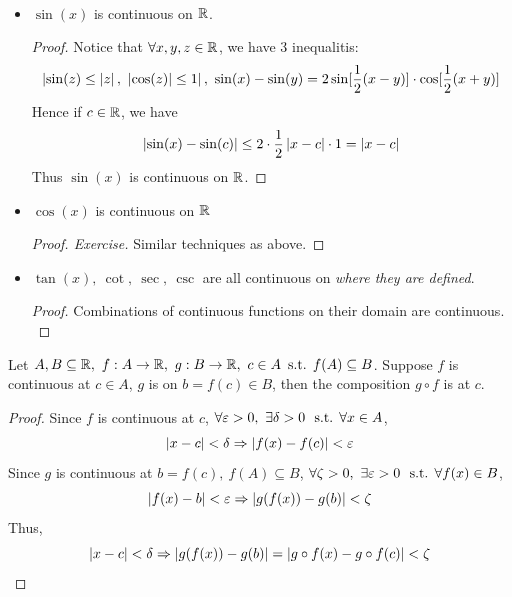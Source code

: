 \documentclass[a4paper,12pt]{article}
\begin{document}
\begin{example}\ 
    \begin{itemize}
        \item \(\sin(x)\) is continuous on \(\mathbb{R}\).
        \begin{proof}
            Notice that \(\forall x, y, z\in \mathbb{R}\), we have 3 inequalitis:
            \[\abs{\sin(z)\le \abs{z},\ \abs{\cos(z)}\le 1},\ \sin(x)-\sin(y)=2\sin[\dfrac{1}{2}(x-y)]\cdot \cos[\dfrac{1}{2}(x+y)]\]
            Hence if \(c\in\mathbb{R}\), we have 
            \[\left\lvert \sin(x)-\sin(c)\right\rvert\le 2\cdot \frac{1}{2}\left\lvert x-c\right\rvert\cdot 1=\left\lvert x-c\right\rvert\]
            Thus \(\sin(x)\) is continuous on \(\mathbb{R}\).
        \end{proof}
        \item \(\cos(x)\) is continuous on \(\mathbb{R}\)
        \begin{proof}[Proof. Exercise]
            Similar techniques as above.
        \end{proof}
        \item \(\tan(x),\ \cot,\ \sec,\ \csc\) are all continuous on \textit{where they are defined}.
        \begin{proof}
            Combinations of continuous functions on their domain are continuous.\\
        \end{proof}
    \end{itemize}
\end{example}

\begin{theorem}
    Let \(A,B\subseteq\R,\ f:A\rightarrow\R,\ g:B\rightarrow\R,\ c \in A\, \st f(A)\subseteq B\). Suppose \(f\) is continuous at \(c\in A\), 
    \(g\) is  on \(b=f(c)\in B\), then the composition \(g \circ f\) is \highlight{continuous} at \(c\). 
    
    \begin{proof}
        Since \(f\) is continuous at \(c\), \(\forall \varepsilon>0,\ \exists \delta>0\ \text{ s.t. }\forall x\in A\), 
        \[\left\lvert x-c\right\rvert<\delta\Rightarrow\left\lvert f(x)-f(c)\right\rvert<\varepsilon\]
        Since \(g\) is continuous at \(b=f(c),\ f(A)\subseteq B\), \(\forall \zeta>0,\ \exists \varepsilon>0\ \text{ s.t. }\forall f(x)\in B\), 
        \[\left\lvert f(x)-b\right\rvert<\varepsilon\Rightarrow\left\lvert g(f(x))-g(b)\right\rvert<\zeta\]
        Thus,
        \[\left\lvert x-c\right\rvert<\delta\Rightarrow\left\lvert g(f(x))-g(b)\right\rvert=\left\lvert g\circ f(x)-g\circ f(c)\right\rvert<\zeta\]
    \end{proof}
\end{theorem}
\end{document}
